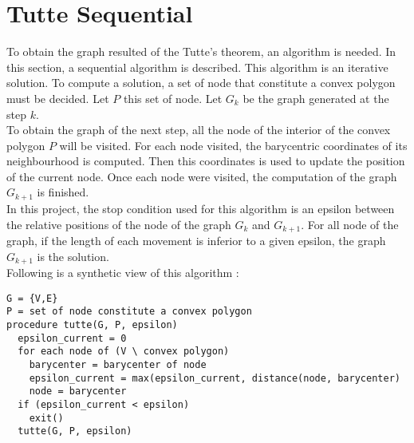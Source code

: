 \section{Tutte Sequential}

To obtain the graph resulted of the Tutte's theorem, an algorithm is
needed. In this section, a sequential algorithm is described. This
algorithm is an iterative solution. To compute a solution, a set of node
that constitute a convex polygon must be decided. Let $P$ this set of node. Let
$G_k$ be the graph generated at the step $k$.
\\

To obtain the graph of the next step, all the node of the interior of the
convex polygon $P$ will be visited. For each node visited, the barycentric
coordinates of its neighbourhood is computed. Then this coordinates is used
to update the position of the current node. Once each node were visited,
the computation of the graph $G_{k+1}$ is finished.
\\
In this project, the stop condition used for this algorithm is an epsilon
between the relative positions of the node of the graph $G_k$ and
$G_{k+1}$. For all node of the graph, if the length of each movement is
inferior to a given epsilon, the graph $G_{k+1}$ is the solution.
\\

Following is a synthetic view of this algorithm : 
\begin{verbatim}
G = {V,E}
P = set of node constitute a convex polygon
procedure tutte(G, P, epsilon)
  epsilon_current = 0
  for each node of (V \ convex polygon)
    barycenter = barycenter of node
    epsilon_current = max(epsilon_current, distance(node, barycenter)
    node = barycenter
  if (epsilon_current < epsilon)
    exit()
  tutte(G, P, epsilon)
\end{verbatim}


